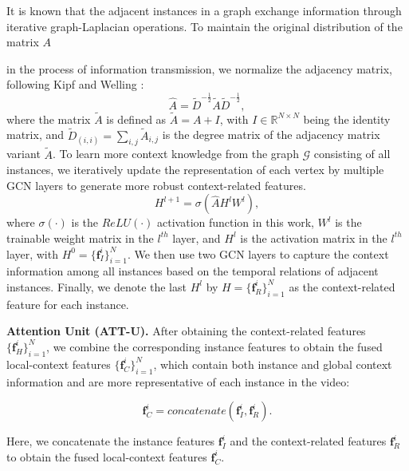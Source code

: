 \documentclass[sigconf]{acmart}
\begin{document}
It is known that the adjacent instances in a graph exchange information through iterative graph-Laplacian operations.
To maintain the original distribution of the matrix $A$

in the process of information transmission, we normalize the adjacency matrix, following Kipf and Welling \cite{kipf2016semi}:
\begin{equation}
\widehat{A} = \widetilde{D}^{-\frac{1}{2}} \widetilde{A} \widetilde{D}^{-\frac{1}{2}},
\end{equation}
where the matrix $\widetilde{A}$ is defined as $\widetilde{A} = A + I $, with $I \in \mathbb{R}^{N \times N} $ being the identity matrix, and $\widetilde{D}_{(i,i)} = \sum_{i,j} \widetilde{A}_{i,j}$ is the degree matrix of the adjacency matrix variant $\widetilde{A}$.
To learn more context knowledge from the graph $\mathcal{G}$ consisting of all instances, we iteratively update the representation of each vertex by multiple GCN layers to generate more robust context-related features.
\begin{equation}
H^{l+1} = \sigma( \widehat{A} H^{l} W^{l}),
\end{equation}
where $\sigma(\cdot) $ is the $ReLU(\cdot)$ activation function in this work, $W^{l}$ is the trainable weight matrix in the $l^{th}$ layer, and $H^{l}$ is the activation matrix in the $l^{th}$ layer, with $H^{0} =  \{\mathbf{f}_I^i\}_{i=1}^N$. We then use two GCN layers to capture the context information among all instances based on the temporal relations of adjacent instances. Finally, we denote the last $H^{l}$ by $H = \{\mathbf{f}_R^i\}_{i=1}^N$ as the context-related feature for each instance.

\vspace{5pt}

\noindent\textbf{Attention Unit (ATT-U).} After obtaining the context-related features $\{\mathbf{f}_H^i\}_{i=1}^N$, we combine the corresponding instance features to obtain the fused local-context features $\{\mathbf{f}_C^i\}_{i=1}^N$, which contain both instance and global context information and are more representative of each instance in the video:

\begin{equation}
\mathbf{f}_C^i = concatenate(\mathbf{f}_I^i,\mathbf{f}_R^i).
\end{equation}

Here, we concatenate the instance features $\mathbf{f}_I^i$ and the context-related features $\mathbf{f}_R^i$ to obtain the fused local-context features $\mathbf{f}_C^i$.
\end{document}
